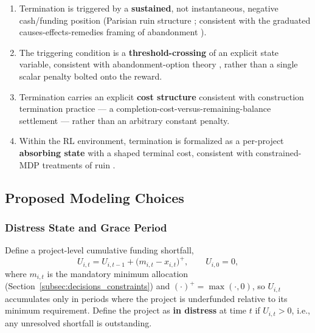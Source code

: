 \begin{enumerate}
\item Termination is triggered by a \textbf{sustained}, not instantaneous, negative cash/funding position (Parisian ruin structure \cite{dassioswu2008parisian}; consistent with the graduated causes-effects-remedies framing of abandonment \cite{macbarango2017abandonment}).
\item The triggering condition is a \textbf{threshold-crossing} of an explicit state variable, consistent with abandonment-option theory \cite{dixitpindyck1994investment}, rather than a single scalar penalty bolted onto the reward.
\item Termination carries an explicit \textbf{cost structure} consistent with construction termination practice — a completion-cost-versus-remaining-balance settlement — rather than an arbitrary constant penalty.
\item Within the RL environment, termination is formalized as a per-project \textbf{absorbing state} with a shaped terminal cost, consistent with constrained-MDP treatments of ruin \cite{borkarjain2014riskconstrained}.
\end{enumerate}

\subsection{Proposed Modeling Choices}
\label{subsec:distress_modeling}

\subsubsection{Distress State and Grace Period}
\label{subsubsec:model_distress_state}

Define a project-level cumulative funding shortfall,
\[
U_{i,t} = U_{i,t-1} + \bigl(m_{i,t} - x_{i,t}\bigr)^{+}, \qquad U_{i,0} = 0,
\]
where $m_{i,t}$ is the mandatory minimum allocation (Section~\ref{subsec:decisions_constraints}) and $(\cdot)^{+} = \max(\cdot, 0)$, so $U_{i,t}$ accumulates only in periods where the project is underfunded relative to its minimum requirement. Define the project as \textbf{in distress} at time $t$ if $U_{i,t} > 0$, i.e., any unresolved shortfall is outstanding.

